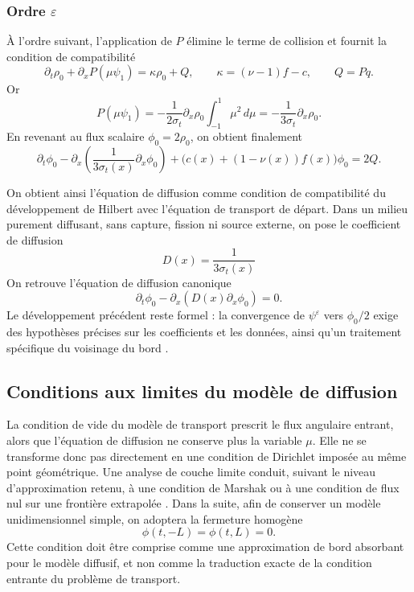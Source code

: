 \documentclass{article}
\begin{document}
\subsubsection{Ordre \(\varepsilon\)}
À l'ordre suivant, l'application de $P$ élimine le terme de collision et fournit la condition de compatibilité
\[
\partial_t\rho_0+\partial_xP(\mu\psi_1)=\kappa\rho_0+Q,
\qquad
\kappa=(\nu-1)f-c,
\qquad Q=Pq.
\]
Or
\[
P(\mu\psi_1)
=-\frac{1}{2\sigma_t}\partial_x\rho_0\int_{-1}^1\mu^2\,d\mu
=-\frac{1}{3\sigma_t}\partial_x\rho_0.
\]
En revenant au flux scalaire $\phi_0=2\rho_0$, on obtient finalement
\begin{equation}
    \partial_t\phi_0 - \partial_x\left(\frac{1}{3\sigma_t(x)}\partial_x\phi_0\right)
    +\bigl(c(x)+(1-\nu(x))f(x)\bigr)\phi_0 = 2Q.
    \label{eq:limite-diffusion}
\end{equation}

On obtient ainsi l'équation de diffusion comme condition de compatibilité du développement de Hilbert avec l'équation de transport de départ. Dans un milieu purement diffusant, sans capture, fission ni source externe, on pose le coefficient de diffusion
\begin{equation}
    D(x) = \frac{1}{3\sigma_t(x)} 
\end{equation}
On retrouve l'équation de diffusion canonique 
\begin{equation}
    \partial_t\phi_0 - \partial_x\left(D(x)\partial_x\phi_0\right) = 0.
\end{equation}
Le développement précédent reste formel : la convergence de $\psi^\varepsilon$ vers $\phi_0/2$ exige des hypothèses précises sur les coefficients et les données, ainsi qu'un traitement spécifique du voisinage du bord \cite[chap.~4, sections~4.2--4.3]{Allaire2018}.

\subsection{Conditions aux limites du modèle de diffusion}
La condition de vide du modèle de transport prescrit le flux angulaire entrant, alors que l'équation de diffusion ne conserve plus la variable $\mu$. Elle ne se transforme donc pas directement en une condition de Dirichlet imposée au même point géométrique. Une analyse de couche limite conduit, suivant le niveau d'approximation retenu, à une condition de Marshak ou à une condition de flux nul sur une frontière extrapolée \cite[chap.~4, section~4.3]{Allaire2018,Bardos1984}. Dans la suite, afin de conserver un modèle unidimensionnel simple, on adoptera la fermeture homogène
\[
\phi(t,-L)=\phi(t,L)=0.
\]
Cette condition doit être comprise comme une approximation de bord absorbant pour le modèle diffusif, et non comme la traduction exacte de la condition entrante du problème de transport.
\end{document}
